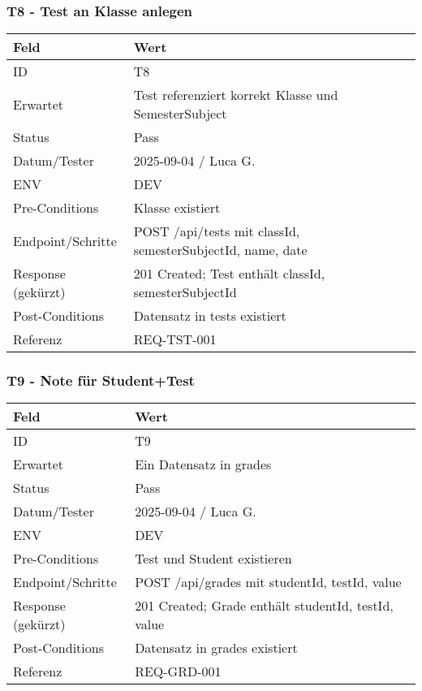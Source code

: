 \documentclass[12pt,a4paper]{article}
\begin{document}
    \subsubsection{T8 - Test an Klasse anlegen}
    {\small
        \begin{tabularx}{\textwidth}{|p{3.2cm}|X|}
            \hline
            \textbf{Feld} & \textbf{Wert} \\ \hline
            ID & T8 \\ \hline
            Erwartet & Test referenziert korrekt Klasse und SemesterSubject \\ \hline
            Status & Pass \\ \hline
            Datum/Tester & 2025-09-04 / Luca G. \\ \hline
            ENV & DEV \\ \hline
            Pre-Conditions & Klasse existiert \\ \hline
            Endpoint/Schritte & POST /api/tests mit {classId, semesterSubjectId, name, date} \\ \hline
            Response (gekürzt) & 201 Created; Test enthält classId, semesterSubjectId \\ \hline
            Post-Conditions & Datensatz in tests existiert \\ \hline
            Referenz & REQ-TST-001 \\ \hline
        \end{tabularx}
    }

    \subsubsection{T9 - Note für Student+Test}
    {\small
        \begin{tabularx}{\textwidth}{|p{3.2cm}|X|}
            \hline
            \textbf{Feld} & \textbf{Wert} \\ \hline
            ID & T9 \\ \hline
            Erwartet & Ein Datensatz in grades \\ \hline
            Status & Pass \\ \hline
            Datum/Tester & 2025-09-04 / Luca G. \\ \hline
            ENV & DEV \\ \hline
            Pre-Conditions & Test und Student existieren \\ \hline
            Endpoint/Schritte & POST /api/grades mit {studentId, testId, value} \\ \hline
            Response (gekürzt) & 201 Created; Grade enthält studentId, testId, value \\ \hline
            Post-Conditions & Datensatz in grades existiert \\ \hline
            Referenz & REQ-GRD-001 \\ \hline
        \end{tabularx}
    }
\end{document}
